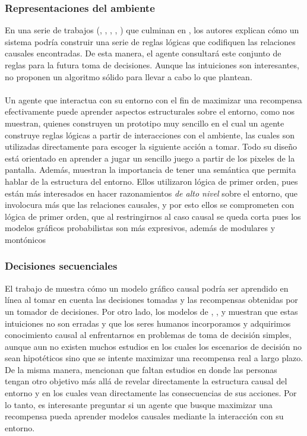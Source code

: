 \documentclass[11pt]{article}
\theoremstyle{plain}
\begin{document}
\subsubsection{Representaciones del ambiente}
En una serie de trabajos (\cite{ho2013knowledge}, \cite{ho2014rapid}, \cite{ho2016ground}, \cite{ho2016principles}, \cite{ho2016cognitively}) que culminan en \cite{ho2016reinforcement}, los autores explican cómo un sistema podría construir una serie de reglas lógicas que codifiquen las relaciones causales encontradas. De esta manera, el agente consultará este conjunto de reglas para la futura toma de decisiones. Aunque las intuiciones son interesantes, no proponen un algoritmo sólido para llevar a cabo lo que plantean. \\
\\
 Un agente que interactua con su entorno con el fin de maximizar una recompensa efectivamente puede aprender aspectos estructurales sobre el entorno, como nos muestran\cite{garnelo2016towards}, quienes construyen un prototipo muy sencillo en el cual un agente construye reglas lógicas a partir de interacciones con el ambiente, las cuales son utilizadas directamente para escoger la siguiente acción a tomar. Todo su diseño está orientado en aprender a jugar un sencillo juego a partir de los pixeles de la pantalla. Además, muestran la importancia de tener una semántica que permita hablar de la estructura del entorno. Ellos utilizaron lógica de primer orden, pues están más interesados en hacer razonamientos \textit{de alto nivel} sobre el entorno, que involocura más que las relaciones causales, y por esto ellos se comprometen con lógica de primer orden, que al restringirnos al caso causal se queda corta pues los modelos gráficos probabilistas son más expresivos, además de modulares y montónicos
\subsubsection{Decisiones secuenciales}
El trabajo de \cite{wellen2012learning} muestra cómo un modelo gráfico causal podría ser aprendido en línea al tomar en cuenta las decisiones tomadas y las recompensas obtenidas por un tomador de decisiones. Por otro lado, los modelos de \cite{sloman2006causal}, \cite{meder2008inferring}, \cite{hagmayer2009decision} y \cite{hagmayer2013repeated} muestran que estas intuiciones no son erradas y que los seres humanos incorporamos y adquirimos conocimiento causal al enfrentarnos en problemas de toma de decisión simples, aunque aun no existen muchos estudios en los cuales los escenarios de decisión no sean hipotéticos sino que se intente maximizar una recompensa real a largo plazo. De la misma manera, \cite{hagmayer2013repeated} mencionan que faltan estudios en donde las personas tengan otro objetivo más allá de revelar directamente la estructura causal del entorno y en los cuales vean directamente las consecuencias de sus acciones. Por lo tanto, es interesante preguntar si un agente que busque maximizar una recompensa pueda aprender modelos causales mediante la interacción con su entorno.
\end{document}
